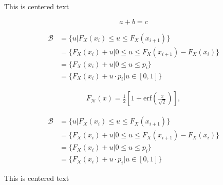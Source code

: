 \begin{frame}[t]

\begin{center}
This is centered text
\end{center}

\[
a + b = c
\]


\begin{align*}
    \mathcal{B} &=\{u | F_X(x_i) \leq u \leq F_X(x_{i+1})\} \\
                &= \{F_X(x_i) + u | 0 \leq u \leq F_X(x_{i+1}) - F_X(x_i)\} \\
                &=\{F_X(x_i) + u | 0 \leq u \leq p_i\}\\
                &=  \{F_X(x_i) + u \cdot p_i | u \in [0,1] \}
\end{align*}


\begin{align*}
    F_{\mathcal{N}}(x)=\frac{1}{2} \left[1 + \text{erf}\left( \frac{x}{\sqrt{2}} \right) \right] ,
\end{align*}

\begin{align*}
    \mathcal{B} &=\{u | F_X(x_i) \leq u \leq F_X(x_{i+1})\} \\
                &= \{F_X(x_i) + u | 0 \leq u \leq F_X(x_{i+1}) - F_X(x_i)\} \\
                &=\{F_X(x_i) + u | 0 \leq u \leq p_i\}\\
                &=  \{F_X(x_i) + u \cdot p_i | u \in [0,1] \}
\end{align*}

\begin{center}
This is centered text
\end{center}

\end{frame}

